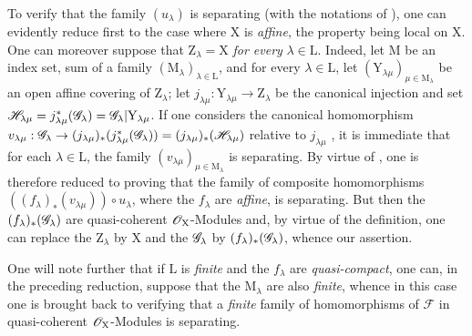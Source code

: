 \begin{env}[11.9.3]
\label{IV.11.9.3}
To verify that the family $(u_\lambda)$ is separating (with the notations of ), one can evidently reduce first to the case where $\mathrm{X}$ is \emph{affine}, the property being local on $\mathrm{X}$.
One can moreover suppose that $\mathrm{Z}_\lambda=\mathrm{X}$ \emph{for every} $\lambda\in\mathrm{L}$.
Indeed, let $\mathrm{M}$ be an index set, sum of a family $(\mathrm{M}_\lambda)_{\lambda\in\mathrm{L}}$, and for every $\lambda\in\mathrm{L}$, let $(\mathrm{Y}_{\lambda\mu})_{\mu\in\mathrm{M}_\lambda}$ be an open affine covering of $\mathrm{Z}_\lambda$; let $j_{\lambda\mu}:\mathrm{Y}_{\lambda\mu}\to\mathrm{Z}_\lambda$ be the canonical injection and set $\mathscr{H}_{\lambda\mu}=j_{\lambda\mu}^*(\mathscr{G}_\lambda)=\mathscr{G}_\lambda|\mathrm{Y}_{\lambda\mu}$.
If one considers the canonical homomorphism $v_{\lambda\mu}:\mathscr{G}_\lambda\to(j_{\lambda\mu})_*(j_{\lambda\mu}^*(\mathscr{G}_\lambda))=(j_{\lambda\mu})_*(\mathscr{H}_{\lambda\mu})$ relative to $j_{\lambda\mu}$ , it is immediate that for each $\lambda\in\mathrm{L}$, the family $(v_{\lambda\mu})_{\mu\in\mathrm{M}_\lambda}$ is separating.
By virtue of , one is therefore reduced to proving that the family of composite homomorphisms $((f_\lambda)_*(v_{\lambda\mu}))\circ u_\lambda$, where the $f_\lambda$ are \emph{affine}, is separating.
But then the $(f_\lambda)_*(\mathscr{G}_\lambda)$ are quasi-coherent $\mathscr{O}_\mathrm{X}$-Modules  and, by virtue of the definition, one can replace the $\mathrm{Z}_\lambda$ by $\mathrm{X}$ and the $\mathscr{G}_\lambda$ by $(f_\lambda)_*(\mathscr{G}_\lambda)$, whence our assertion.

One will note further that if $\mathrm{L}$ is \emph{finite} and the $f_\lambda$ are \emph{quasi-compact}, one can, in the preceding reduction, suppose that the $\mathrm{M}_\lambda$ are also \emph{finite}, whence in this case one is brought back to verifying that a \emph{finite} family of homomorphisms of $\mathscr{F}$ in quasi-coherent $\mathscr{O}_\mathrm{X}$-Modules is separating.
\end{env}


